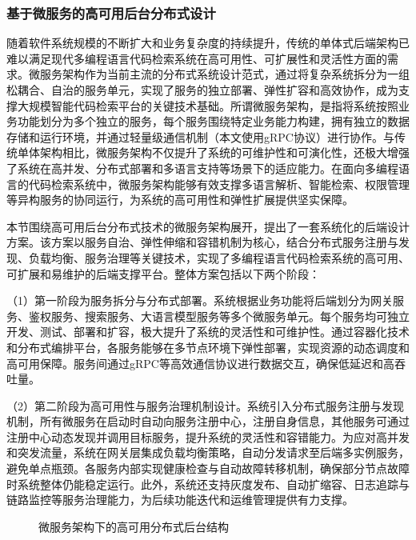 \documentclass[UTF8,a4paper,12pt]{ctexart}
\numberwithin{equation}{section}
\begin{document}
\subsubsection{基于微服务的高可用后台分布式设计}
随着软件系统规模的不断扩大和业务复杂度的持续提升，传统的单体式后端架构已难以满足现代多编程语言代码检索系统在高可用性、可扩展性和灵活性方面的需求。微服务架构作为当前主流的分布式系统设计范式，通过将复杂系统拆分为一组松耦合、自治的服务单元，实现了服务的独立部署、弹性扩容和高效协作，成为支撑大规模智能代码检索平台的关键技术基础。所谓微服务架构，是指将系统按照业务功能划分为多个独立的服务，每个服务围绕特定业务能力构建，拥有独立的数据存储和运行环境，并通过轻量级通信机制（本文使用gRPC协议）进行协作。与传统单体架构相比，微服务架构不仅提升了系统的可维护性和可演化性，还极大增强了系统在高并发、分布式部署和多语言支持等场景下的适应能力。在面向多编程语言的代码检索系统中，微服务架构能够有效支撑多语言解析、智能检索、权限管理等异构服务的协同运行，为系统的高可用性和弹性扩展提供坚实保障。\par
本节围绕高可用后台分布式技术的微服务架构展开，提出了一套系统化的后端设计方案。该方案以服务自治、弹性伸缩和容错机制为核心，结合分布式服务注册与发现、负载均衡、服务治理等关键技术，实现了多编程语言代码检索系统的高可用、可扩展和易维护的后端支撑平台。整体方案包括以下两个阶段：\par
（1）第一阶段为服务拆分与分布式部署。系统根据业务功能将后端划分为网关服务、鉴权服务、搜索服务、大语言模型服务等多个微服务单元。每个服务均可独立开发、测试、部署和扩容，极大提升了系统的灵活性和可维护性。通过容器化技术和分布式编排平台，各服务能够在多节点环境下弹性部署，实现资源的动态调度和高可用保障。服务间通过gRPC等高效通信协议进行数据交互，确保低延迟和高吞吐量。\par
（2）第二阶段为高可用性与服务治理机制设计。系统引入分布式服务注册与发现机制，所有微服务在启动时自动向服务注册中心，注册自身信息，其他服务可通过注册中心动态发现并调用目标服务，提升系统的灵活性和容错能力。为应对高并发和突发流量，系统在网关层集成负载均衡策略，自动分发请求至后端多实例服务，避免单点瓶颈。各服务内部实现健康检查与自动故障转移机制，确保部分节点故障时系统整体仍能稳定运行。此外，系统还支持灰度发布、自动扩缩容、日志追踪与链路监控等服务治理能力，为后续功能迭代和运维管理提供有力支撑。\par
\begin{figure}[H]
	\caption{微服务架构下的高可用分布式后台结构}
	\label{microservice_arch}
\end{figure}
\end{document}
